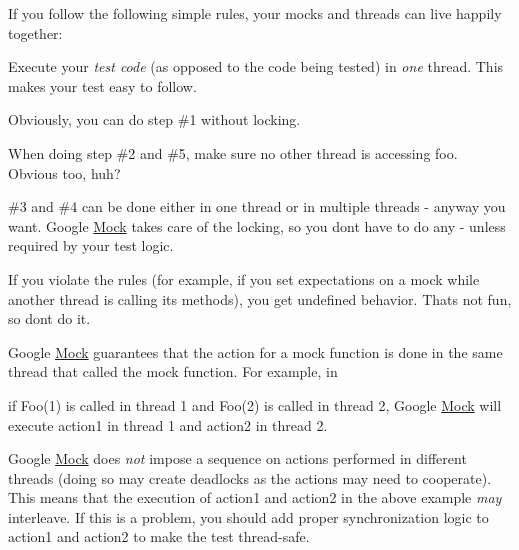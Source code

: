 If you follow the following simple rules, your mocks and threads can live happily together\+:


\begin{DoxyItemize}
\item Execute your {\itshape test code} (as opposed to the code being tested) in {\itshape one} thread. This makes your test easy to follow.
\item Obviously, you can do step \#1 without locking.
\item When doing step \#2 and \#5, make sure no other thread is accessing {\ttfamily foo}. Obvious too, huh?
\item \#3 and \#4 can be done either in one thread or in multiple threads -\/ anyway you want. Google \mbox{\hyperlink{class_mock}{Mock}} takes care of the locking, so you don\textquotesingle{}t have to do any -\/ unless required by your test logic.
\end{DoxyItemize}

If you violate the rules (for example, if you set expectations on a mock while another thread is calling its methods), you get undefined behavior. That\textquotesingle{}s not fun, so don\textquotesingle{}t do it.

Google \mbox{\hyperlink{class_mock}{Mock}} guarantees that the action for a mock function is done in the same thread that called the mock function. For example, in


\begin{DoxyCode}{0}
\end{DoxyCode}


if {\ttfamily Foo(1)} is called in thread 1 and {\ttfamily Foo(2)} is called in thread 2, Google \mbox{\hyperlink{class_mock}{Mock}} will execute {\ttfamily action1} in thread 1 and {\ttfamily action2} in thread 2.

Google \mbox{\hyperlink{class_mock}{Mock}} does {\itshape not} impose a sequence on actions performed in different threads (doing so may create deadlocks as the actions may need to cooperate). This means that the execution of {\ttfamily action1} and {\ttfamily action2} in the above example {\itshape may} interleave. If this is a problem, you should add proper synchronization logic to {\ttfamily action1} and {\ttfamily action2} to make the test thread-\/safe.

